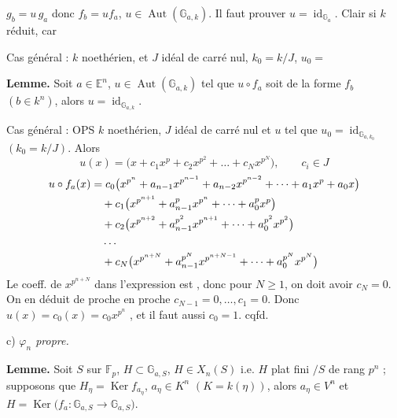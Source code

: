 \documentclass[11pt,a4paper]{article}
\begin{document}

$g_b = u\,g_a$ donc $f_b = u f_a$, $u \in \operatorname{Aut}(\mathbb{G}_{a,k})$.
Il faut prouver $u = \operatorname{id}_{\mathbb{G}_a}$. Clair si $k$ réduit, car

Cas général :  $k$ noethérien, et  $J$ idéal
\struck{\ill{}} de carré nul, $k_0 = k/J$, \struck{\ill{}} $u_0 = {}$\ill{}

\textbf{Lemme.} Soit $a \in \mathbb{E}^n$, $u \in \operatorname{Aut}(\mathbb{G}_{a,k})$
tel que $u \circ f_a$ soit de la forme $f_b$ $(b \in k^n)$, alors
$u = \operatorname{id}_{\mathbb{G}_{a,k}}$.

Cas général : OPS $k$ noethérien, $J$ idéal de carré nul
et $u$ tel que $u_0 = \operatorname{id}_{\mathbb{G}_{a,k_0}}$ $(k_0 = k/J)$. Alors
\[
  u(x) = \bigl(x + c_1 x^{p} + c_2 x^{p^2} + \dots + c_N x^{p^N}\bigr), \qquad c_i \in J
\]
\begin{align}
  u \circ f_a(x) &= c_0\bigl(x^{p^n} + a_{n-1}x^{p^{n-1}} + a_{n-2}x^{p^{n-2}} + \dots + a_1 x^p + a_0 x\bigr) \notag \\
   &\quad {} + c_1\bigl(x^{p^{n+1}} + a_{n-1}^{p} x^{p^{n}} + \dots + a_0^{p} x^{p}\bigr) \notag \\
   &\quad {} + c_2\bigl(x^{p^{n+2}} + a_{n-1}^{p^2} x^{p^{n+1}} + \dots + a_0^{p^2} x^{p^2}\bigr) \notag \\
   &\quad \dots \notag \\
   &\quad {} + c_N\bigl(x^{p^{n+N}} + a_{n-1}^{p^N} x^{p^{n+N-1}} + \dots + a_0^{p^N} x^{p^N}\bigr) \notag
\end{align}
Le coeff. de $x^{p^{n+N}}$ dans l'expression \ill{} est ,
donc pour $N \geqslant 1$, on doit avoir $c_N = 0$. On en déduit de proche en proche
$c_{N-1} = 0, \dots, c_1 = 0$. Donc $u(x) = c_0(x) = c_0 x^{p^n}$ \ill{}, et il
faut aussi $c_0 = 1$. cqfd.

c) \emph{$\varphi_n$  propre.} \ill{}  \ill{}
\struck{\ill{}}

\textbf{Lemme.} Soit $S$  sur $\mathbb{F}_p$,
$H \subset \mathbb{G}_{a,S}$, $H \in X_n(S)$ i.e. $H$ plat fini $/S$ de rang $p^n$ ;
supposons que $H_\eta = \operatorname{Ker} f_{a_\eta}$, $a_\eta \in K^n$
$(K = k(\eta))$, alors $a_\eta \in V^n$ et \struck{\ill{}}
$H = \operatorname{Ker}\bigl(f_a : \mathbb{G}_{a,S} \to \mathbb{G}_{a,S}\bigr)$.
\end{document}
